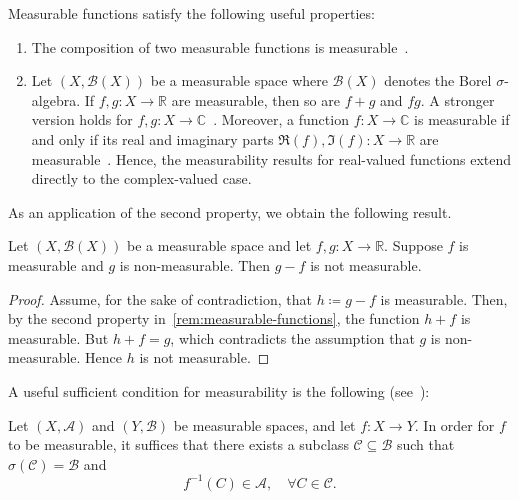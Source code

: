 \begin{remarknl}
    \label{rem:measurable-functions}
    Measurable functions satisfy the following useful properties:
    \begin{enumerate}
        \item The composition of two measurable functions is measurable~\cite[Prop.~1.9]{MeasureTheoryCohn}.
        \item Let $(X, \mathcal{B}(X))$ be a measurable space where $\mathcal{B}(X)$ denotes the Borel $\sigma$-algebra. If $f, g : X \to \mathbb{R}$ are measurable, then so are $f+g$ and $fg$. A stronger version holds for $f, g : X \to \mathbb{C}$~\cite[Prop.~2.6]{FollandRealAnalysis}. Moreover, a function $f : X \to \mathbb{C}$ is measurable if and only if its real and imaginary parts $\Re(f), \Im(f) : X \to \mathbb{R}$ are measurable~\cite[Cor.~2.5]{FollandRealAnalysis}. Hence, the measurability results for real-valued functions extend directly to the complex-valued case.
    \end{enumerate}
\end{remarknl}

As an application of the second property, we obtain the following result.

\begin{corollary}
    Let $(X, \mathcal{B}(X))$ be a measurable space and let $f, g : X \to \mathbb{R}$. Suppose $f$ is measurable and $g$ is non-measurable. Then $g-f$ is not measurable.
\end{corollary}

\begin{proof}

    Assume, for the sake of contradiction, that $h \coloneq g - f$ is measurable. Then, by the second property in~\ref{rem:measurable-functions}, the function $h+f$ is measurable. But $h+f = g$, which contradicts the assumption that $g$ is non-measurable. Hence $h$ is not measurable.
\end{proof}

A useful sufficient condition for measurability is the following (see~\cite[Prop.~1.9]{MeasureTheoryLeGall}):

\begin{proposition}
    \label{prop:measurability-sufficient-cond}
    Let $(X, \mathcal{A})$ and $(Y, \mathcal{B})$ be measurable spaces, and let $f : X \to Y$. In order for $f$ to be measurable, it suffices that there exists a subclass $\mathcal{C} \subseteq \mathcal{B}$ such that $\sigma(\mathcal{C}) = \mathcal{B}$ and
    \[
        f^{-1}(C) \in \mathcal{A}, \quad \forall C \in \mathcal{C}.
    \]
\end{proposition}


